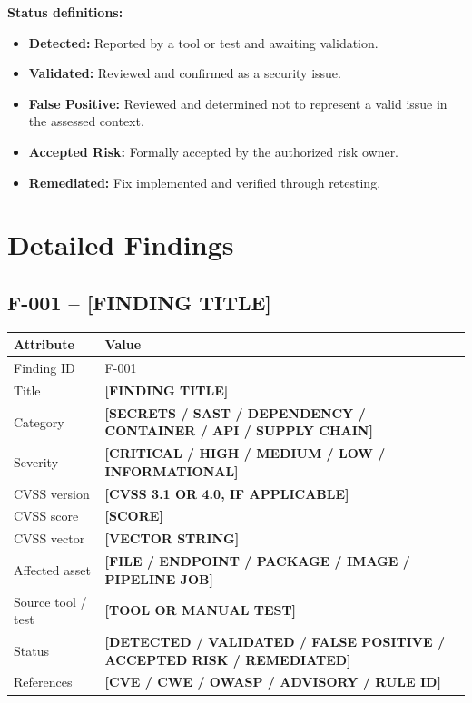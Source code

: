 \documentclass[11pt,a4paper]{report}
\newcommand{\placeholder}[1]{\textbf{[#1]}}
\begin{document}
\textbf{Status definitions:}
\begin{itemize}
    \item \textbf{Detected:} Reported by a tool or test and awaiting validation.
    \item \textbf{Validated:} Reviewed and confirmed as a security issue.
    \item \textbf{False Positive:} Reviewed and determined not to represent a
          valid issue in the assessed context.
    \item \textbf{Accepted Risk:} Formally accepted by the authorized risk owner.
    \item \textbf{Remediated:} Fix implemented and verified through retesting.
\end{itemize}

\chapter{Detailed Findings}

\section{F-001 -- \placeholder{FINDING TITLE}}

\begin{tabularx}{\textwidth}{@{}p{43mm}Y@{}}
    \toprule
    \textbf{Attribute} & \textbf{Value} \\
    \midrule
    Finding ID & F-001 \\
    Title & \placeholder{FINDING TITLE} \\
    Category & \placeholder{SECRETS / SAST / DEPENDENCY / CONTAINER / API / SUPPLY CHAIN} \\
    Severity & \placeholder{CRITICAL / HIGH / MEDIUM / LOW / INFORMATIONAL} \\
    CVSS version & \placeholder{CVSS 3.1 OR 4.0, IF APPLICABLE} \\
    CVSS score & \placeholder{SCORE} \\
    CVSS vector & \placeholder{VECTOR STRING} \\
    Affected asset & \placeholder{FILE / ENDPOINT / PACKAGE / IMAGE / PIPELINE JOB} \\
    Source tool / test & \placeholder{TOOL OR MANUAL TEST} \\
    Status & \placeholder{DETECTED / VALIDATED / FALSE POSITIVE / ACCEPTED RISK / REMEDIATED} \\
    References & \placeholder{CVE / CWE / OWASP / ADVISORY / RULE ID} \\
    \bottomrule
\end{tabularx}
\end{document}
